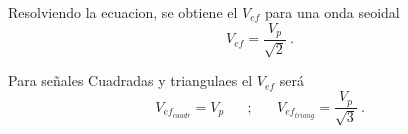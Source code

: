             \noindent Resolviendo la ecuacion, se obtiene el \(V_{ef}\) 
            para una onda seoidal 
            \begin{equation*}
                V_{ef} = \dfrac{V_p}{\sqrt{2}}~.    
            \end{equation*}    

            \noindent Para señales Cuadradas y triangulaes el \(V_{ef}\) será
            \begin{equation*}
                V_{ef_{cuadr}}  =  V_p \hspace{20pt} ; \hspace{20pt}
                V_{ef_{triang}} = \dfrac{V_p}{\sqrt{3}}~.
            \end{equation*}